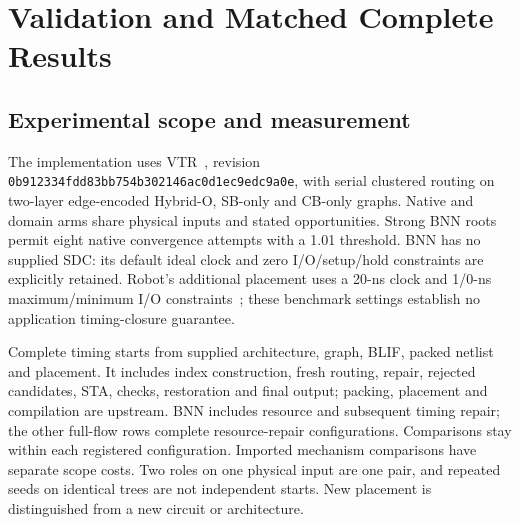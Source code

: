 \documentclass[conference,10pt]{IEEEtran}
\begin{document}
\section{Validation and Matched Complete Results}
\subsection{Experimental scope and measurement}
The implementation uses VTR~\cite{vtr9paper}, revision \texttt{0b912334fdd83bb754b302146ac0d1ec9edc9a0e}, with serial clustered routing on two-layer edge-encoded Hybrid-O, SB-only and CB-only graphs. Native and domain arms share physical inputs and stated opportunities. Strong BNN roots permit eight native convergence attempts with a 1.01 threshold. BNN has no supplied SDC: its default ideal clock and zero I/O/setup/hold constraints are explicitly retained. Robot's additional placement uses a 20-ns clock and 1/0-ns maximum/minimum I/O constraints~\cite{vprsdc}; these benchmark settings establish no application timing-closure guarantee.

Complete timing starts from supplied architecture, graph, BLIF, packed netlist and placement. It includes index construction, fresh routing, repair, rejected candidates, STA, checks, restoration and final output; packing, placement and compilation are upstream. BNN includes resource and subsequent timing repair; the other full-flow rows complete resource-repair configurations. Comparisons stay within each registered configuration. Imported mechanism comparisons have separate scope costs. Two roles on one physical input are one pair, and repeated seeds on identical trees are not independent starts. New placement is distinguished from a new circuit or architecture.
\end{document}
